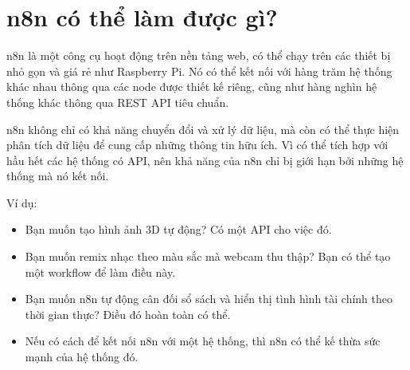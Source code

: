 \section{n8n có thể làm được gì?}

n8n là một công cụ hoạt động trên nền tảng web, có thể chạy trên các thiết bị nhỏ gọn và giá rẻ như Raspberry Pi. Nó có thể kết nối với hàng trăm hệ thống khác nhau thông qua các node được thiết kế riêng, cũng như hàng nghìn hệ thống khác thông qua REST API tiêu chuẩn.

n8n không chỉ có khả năng chuyển đổi và xử lý dữ liệu, mà còn có thể thực hiện phân tích dữ liệu để cung cấp những thông tin hữu ích. Vì có thể tích hợp với hầu hết các hệ thống có API, nên khả năng của n8n chỉ bị giới hạn bởi những hệ thống mà nó kết nối.

Ví dụ:
\begin{itemize}
    \item Bạn muốn tạo hình ảnh 3D tự động? Có một API cho việc đó.

    \item Bạn muốn remix nhạc theo màu sắc mà webcam thu thập? Bạn có thể tạo một workflow để làm điều này.
    
    \item Bạn muốn n8n tự động cân đối sổ sách và hiển thị tình hình tài chính theo thời gian thực? Điều đó hoàn toàn có thể.

    \item Nếu có cách để kết nối n8n với một hệ thống, thì n8n có thể kế thừa sức mạnh của hệ thống đó.
\end{itemize}
